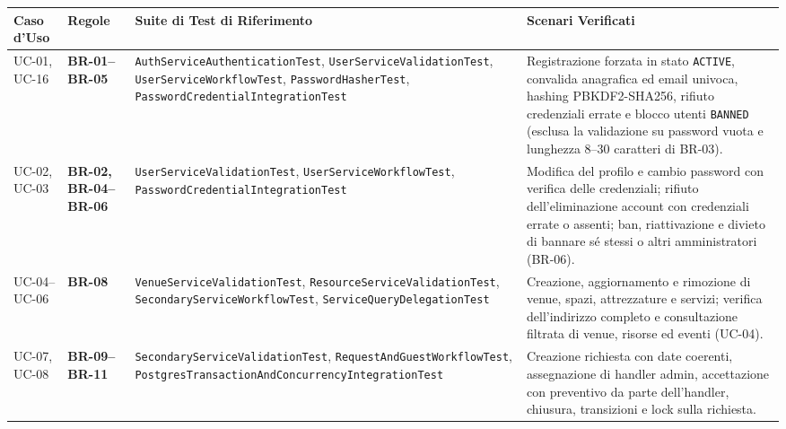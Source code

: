 \begin{table}[htbp]
\centering
\footnotesize
\setlength{\tabcolsep}{4pt}
\renewcommand{\arraystretch}{1.12}
\begin{tabularx}{\textwidth}{@{}>{\raggedright\arraybackslash}p{2.15cm}>{\raggedright\arraybackslash}p{2.35cm}>{\raggedright\arraybackslash}p{5.50cm}>{\raggedright\arraybackslash}X@{}}
\toprule
\textbf{Caso d'Uso} & \textbf{Regole} & \textbf{Suite di Test di Riferimento} & \textbf{Scenari Verificati} \\
\midrule
UC-01, UC-16 & \textbf{\mbox{BR-01--BR-05}} & \texttt{AuthServiceAuthenticationTest}, \newline \texttt{UserServiceValidationTest}, \newline \texttt{UserServiceWorkflowTest}, \newline \texttt{PasswordHasherTest}, \newline \texttt{PasswordCredential\allowbreak{}IntegrationTest} & Registrazione forzata in stato \texttt{ACTIVE}, convalida anagrafica ed email univoca, hashing PBKDF2-SHA256, rifiuto credenziali errate e blocco utenti \texttt{BANNED} (esclusa la validazione su password vuota e lunghezza 8--30 caratteri di BR-03). \\
\addlinespace[3pt]
UC-02, UC-03 & \textbf{BR-02, \mbox{BR-04--BR-06}} & \texttt{UserServiceValidationTest}, \newline \texttt{UserServiceWorkflowTest}, \newline \texttt{PasswordCredential\allowbreak{}IntegrationTest} & Modifica del profilo e cambio password con verifica delle credenziali; rifiuto dell'eliminazione account con credenziali errate o assenti; ban, riattivazione e divieto di bannare sé stessi o altri amministratori (BR-06). \\
\addlinespace[3pt]
\mbox{UC-04--UC-06} & \textbf{BR-08} & \texttt{VenueServiceValidationTest}, \newline \texttt{ResourceServiceValidationTest}, \newline \texttt{SecondaryServiceWorkflowTest}, \newline \texttt{ServiceQueryDelegationTest} & Creazione, aggiornamento e rimozione di venue, spazi, attrezzature e servizi; verifica dell'indirizzo completo e consultazione filtrata di venue, risorse ed eventi (UC-04). \\
\addlinespace[3pt]
UC-07, UC-08 & \textbf{\mbox{BR-09--BR-11}} & \texttt{SecondaryServiceValidationTest}, \newline \texttt{RequestAndGuestWorkflowTest}, \newline \texttt{PostgresTransaction\allowbreak{}AndConcurrency\allowbreak{}IntegrationTest} & Creazione richiesta con date coerenti, assegnazione di handler admin, accettazione con preventivo da parte dell'handler, chiusura, transizioni e lock sulla richiesta. \\

\end{tabularx}
\end{table}
